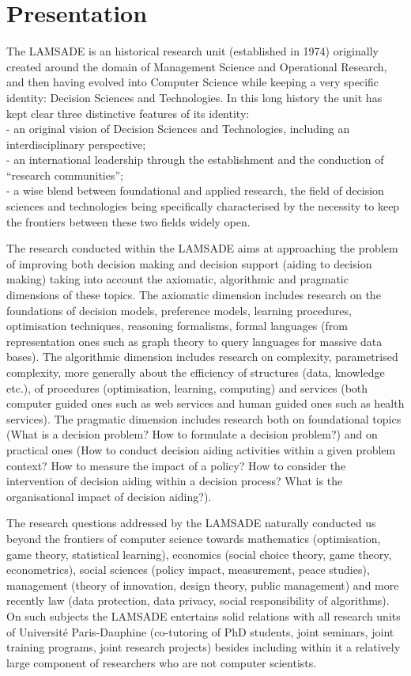 \section{Presentation}\label{presentation}

The LAMSADE is an historical research unit (established in 1974) originally created around the domain of Management Science and Operational Research, and then having evolved into Computer Science while keeping a very specific identity: Decision Sciences and Technologies. In this long history the unit has kept clear three distinctive features of its identity: \\
 - an original vision of Decision Sciences and Technologies, including an interdisciplinary perspective; \\
 - an international leadership through the establishment and the conduction of ``research communities''; \\
 - a wise blend between foundational and applied research, the field of decision sciences and technologies being specifically characterised by the necessity to keep the frontiers between these two fields widely open.

The research conducted within the LAMSADE aims at approaching the problem of improving both decision making and decision support (aiding to decision making) taking into account the axiomatic, algorithmic and pragmatic dimensions of these topics. The axiomatic dimension includes research on the foundations of decision models, preference models, learning procedures, optimisation techniques, reasoning formalisms, formal languages (from representation ones such as graph theory to query languages for massive data bases). The algorithmic dimension includes research on complexity, parametrised complexity, more generally about the efficiency of structures (data, knowledge etc.), of procedures (optimisation, learning, computing) and services (both computer guided ones such as web services and human guided ones such as health services). The pragmatic dimension includes research both on foundational topics (What is a decision problem? How to formulate a decision problem?) and on practical ones (How to conduct decision aiding activities within a given problem context? How to measure the impact of a policy? How to consider the intervention of decision aiding within a decision process? What is the organisational impact of decision aiding?).

The research questions addressed by the LAMSADE naturally conducted us beyond the frontiers of computer science towards mathematics (optimisation, game theory, statistical learning), economics (social choice theory, game theory, econometrics), social sciences (policy impact, measurement, peace studies), management (theory of innovation, design theory, public management) and more recently law (data protection, data privacy, social responsibility of algorithms). On such subjects the LAMSADE entertains solid relations with all research units of Université Paris-Dauphine (co-tutoring of PhD students, joint seminars, joint training programs, joint research projects) besides including within it a relatively large component of researchers who are not computer scientists.

